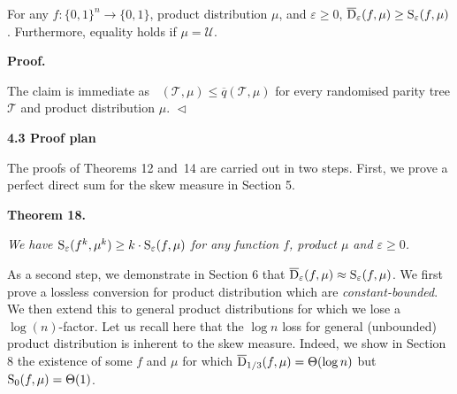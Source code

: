 \documentclass[10pt,a4paper]{article}
\begin{document}
For any $f\colon\{0,1\}^{n}\to\{0,1\}$, product distribution $\mu$, and $\varepsilon\geq 0$, $\overline{{\textup{D}}}_{\varepsilon}(f,\mu)\geq{\textup{S}}_{\varepsilon}(f,\mu)$. Furthermore, equality holds if $\mu=\mathcal{U}$.\par






\par\medskip\noindent\textbf{
\textbf{Proof}.}\par




The claim is immediate as $\mathop{\overline{sq}}(\mathcal{T},\mu)\leq\overline{q}(\mathcal{T},\mu)$ for every randomised parity tree $\mathcal{T}$ and product distribution $\mu$.
$\vartriangleleft$\par







\par\medskip\noindent\textbf{
4.3 Proof plan}\par




The proofs of Theorems 12 and 14 are carried out in two steps. First, we prove a perfect direct sum for the skew measure in Section 5.\par





\par\medskip\noindent\textbf{
\textbf{Theorem 18}\textbf{.}
}\par



\emph{We have ${\textup{S}}_{\varepsilon}(f^{k},\mu^{k})\geq k\cdot{\textup{S}}_{\varepsilon}(f,\mu)$ for any function $f$, product $\mu$ and $\varepsilon\geq 0$.}\par






As a second step, we demonstrate in Section 6 that $\overline{{\textup{D}}}_{\varepsilon}(f,\mu)\approx{\textup{S}}_{\varepsilon}(f,\mu)$. We first prove a lossless conversion for product distribution which are \emph{constant-bounded}. We then extend this to general product distributions for which we lose a $\log(n)$-factor. Let us recall here that the $\log n$ loss for general (unbounded) product distribution is inherent to the skew measure. Indeed, we show in Section 8 the existence of some $f$ and $\mu$ for which $\overline{{\textup{D}}}_{1/3}(f,\mu)=\Theta(\log n)$ but ${\textup{S}}_{0}(f,\mu)=\Theta(1)$.\par
\end{document}
